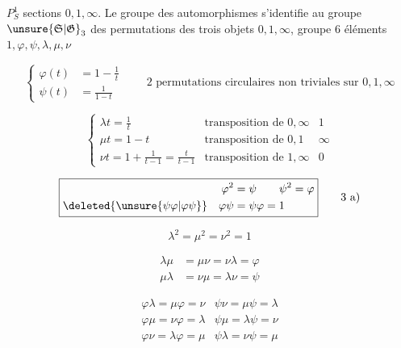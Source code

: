 $P^1_S$ sections $0,1,\infty$. Le groupe des automorphismes s'identifie au groupe $\unsure{\mathfrak{S}|\mathfrak{G}}_3$ des permutations des trois objets $0,1,\infty$, groupe  6 éléments $1,\varphi,\psi,\lambda,\mu,\nu$

\begingroup\makeatletter\tagsleft@true\makeatother
\[
\left\{\begin{aligned}
\varphi(t)&=1-\frac1t\\
\psi(t)&=\frac1{1-t}
\end{aligned}\right.\qquad
\text{2 permutations circulaires non triviales sur }0,1,\infty
\tag*{(1)}
\]
\endgroup

\begingroup\makeatletter\tagsleft@true\makeatother
\[
\left\{\begin{array}{ll||l}
\lambda t=\frac1t&\text{transposition de }0,\infty&1\\
\mu t=1-t&\text{transposition de }0,1&\infty\\
\nu t=1+\frac1{t-1}=\frac{t}{t-1}&\text{transposition de }1,\infty&0
\end{array}\right.
\tag*{(2)}
\]
\endgroup

\begingroup\makeatletter\tagsleft@true\makeatother
\[
\boxed{\begin{aligned}\varphi^2&=\psi\qquad\psi^2=\varphi\\
\deleted{\unsure{\psi\varphi|\varphi\psi}}\quad\varphi\psi&=\psi\varphi=1\end{aligned}}
\tag*{3 a)}
\]
\endgroup

\begingroup\makeatletter\tagsleft@true\makeatother
\[
\boxed{\lambda^2=\mu^2=\nu^2=1}\tag*{b)}
\]
\endgroup

\begingroup\makeatletter\tagsleft@true\makeatother
\[
\boxed{\begin{aligned}\lambda\mu&=\mu\nu=\nu\lambda=\varphi\\
\mu\lambda&=\nu\mu=\lambda\nu=\psi\end{aligned}}\tag*{c)}
\]
\endgroup

\begingroup\makeatletter\tagsleft@true\makeatother
\[
\boxed{\begin{array}{l|l}
\varphi\lambda=\mu\varphi=\nu&\psi\nu=\mu\psi=\lambda\\
\varphi\mu=\nu\varphi=\lambda&\psi\mu=\lambda\psi=\nu\\
\varphi\nu=\lambda\varphi=\mu&\psi\lambda=\nu\psi=\mu
\end{array}}\tag*{d)}
\]
\endgroup

